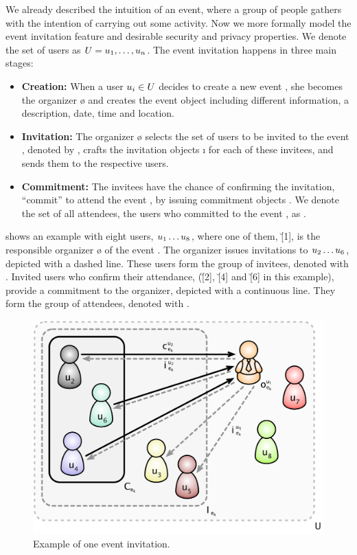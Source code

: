We already described the intuition of   
an event, where a group of people gathers with the intention of carrying 
out some activity. Now we more formally model the event invitation
feature and desirable security and privacy properties. 
%
We denote the set of users as $U{} = u_1, \dots, u_n$. 
The event invitation happens in three main stages: 

\begin{itemize}
	
	\item \textbf{Creation:}
		When a user $\u[i] \in \U{}$ decides to create a new event \e{}, she becomes 
		the organizer \o{} and creates the event object \eo{} including different 
		information, \eg a description, date, time and location.
	
	\item \textbf{Invitation:}
		The organizer \o{} selects the set of users to be invited to the event \e{}, 
		denoted by \I{}, crafts the invitation objects \i{} for each of these invitees, 
		and sends them to the respective users. 
	
	\item \textbf{Commitment:}
		The invitees \I{} have the chance of confirming the invitation, \ie ``commit'' 
		to attend the event \e{}, by issuing commitment objects \cm{}. We denote 
		the set of all attendees, \ie the users who committed to the event \e{},
		as \C{}.
	
\end{itemize}

 shows an example with eight users, $\u[1] \dots \u[8]$, where one 
of them, \u[1], is the responsible organizer \o{} of the event \e{}. 
The organizer issues invitations to $\u[2] \dots \u[6]$, depicted with 
a dashed line. These users form the group of invitees, denoted with \I.
Invited users who confirm their attendance, (\u[2], \u[4] and \u[6] in
this example), provide a commitment to the organizer, depicted with a
continuous line. They form the group of attendees, denoted with \C.

\begin{figure}
  \centering
  \includegraphics[width=.77\linewidth]{images/event-invitations-dosns/system-overview}
  \caption{Example of one event invitation.}
  \label{figure:event-invitations-dosns:system-overview}
\end{figure}

